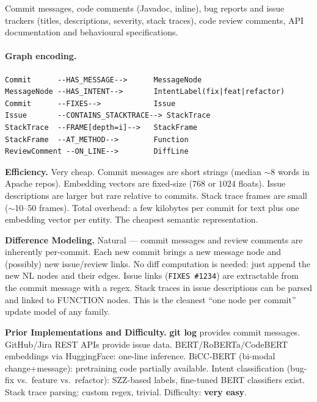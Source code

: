 \documentclass[12pt,a4paper]{article}
\begin{document}
Commit messages, code comments (Javadoc, inline), bug reports and issue
trackers (titles, descriptions, severity, stack traces), code review comments,
API documentation and behavioural specifications.

\paragraph{Graph encoding.}
\begin{lstlisting}
Commit      --HAS_MESSAGE-->      MessageNode
MessageNode --HAS_INTENT-->       IntentLabel(fix|feat|refactor)
Commit      --FIXES-->            Issue
Issue       --CONTAINS_STACKTRACE--> StackTrace
StackTrace  --FRAME[depth=i]-->   StackFrame
StackFrame  --AT_METHOD-->        Function
ReviewComment --ON_LINE-->        DiffLine
\end{lstlisting}

\begin{effbox}
\textbf{Efficiency.}
Very cheap. Commit messages are short strings (median $\sim$8 words in Apache
repos). Embedding vectors are fixed-size ($768$ or $1024$ floats). Issue
descriptions are larger but rare relative to commits. Stack trace frames are
small ($\sim$10--50 frames). Total overhead: a few kilobytes per commit for
text plus one embedding vector per entity. The cheapest semantic representation.
\end{effbox}

\begin{diffbox}
\textbf{Difference Modeling.}
Natural --- commit messages and review comments are inherently per-commit.
Each new commit brings a new message node and (possibly) new issue/review links.
No diff computation is needed: just append the new NL nodes and their edges.
Issue links (\texttt{FIXES \#1234}) are extractable from the commit message with
a regex. Stack traces in issue descriptions can be parsed and linked to FUNCTION
nodes. This is the cleanest ``one node per commit'' update model of any family.
\end{diffbox}

\begin{implbox}
\textbf{Prior Implementations and Difficulty.}
\textbf{git log} provides commit messages. GitHub/Jira REST APIs provide issue
data. BERT/RoBERTa/CodeBERT embeddings via HuggingFace: one-line inference.
BiCC-BERT (bi-modal change+message): pretraining code partially available.
Intent classification (bug-fix vs.\ feature vs.\ refactor): SZZ-based labels,
fine-tuned BERT classifiers exist.
Stack trace parsing: custom regex, trivial. Difficulty: \textbf{very easy}.
\end{implbox}
\end{document}

